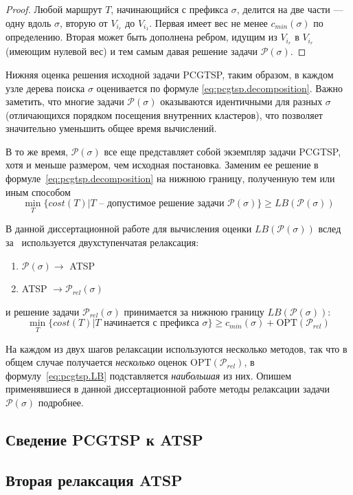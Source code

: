 \begin{proof}
  Любой маршрут $T$,
  начинающийся с префикса $\sigma$,
  делится на две части ---
  одну вдоль $\sigma$,
  вторую от $V_{i_r}$ до ${V_{i_1}}$.
  Первая имеет вес не менее $c_{min}(\sigma)$
  по определению.
  Вторая может быть дополнена ребром,
  идущим из $V_{i_r}$ в ${V_{i_r}}$
  (имеющим нулевой вес)
  и тем самым давая решение задачи
  $\mathcal P(\sigma)$.
\end{proof}

Нижняя оценка решения исходной задачи PCGTSP,
таким образом,
в каждом узле дерева поиска
$\sigma$
оценивается по формуле \eqref{eq:pcgtsp.decomposition}.
Важно заметить,
что многие задачи $\mathcal  P(\sigma)$
оказываются идентичными для разных $\sigma$
(отличающихся порядком посещения внутренних кластеров),
что позволяет значительно уменьшить общее время вычислений.

В то же время,
$\mathcal P(\sigma)$
все еще представляет собой экземпляр
задачи PCGTSP,
хотя и меньше размером,
чем исходная постановка.
Заменим ее решение в формуле~\eqref{eq:pcgtsp.decomposition}
на нижнюю границу,
полученную тем или иным способом
$$
\min_{T}\{cost(T)| T \text{ -- допустимое решение задачи } \mathcal P(\sigma)\}
\geqslant LB(\mathcal P(\sigma))
$$

В данной диссертационной работе для вычисления оценки
$LB(\mathcal P(\sigma))$
вслед за~\cite{SALMAN2020163}
используется двухступенчатая релаксация:
\begin{enumerate}
  \item $\mathcal P(\sigma) \to$ ATSP
  \item ATSP $\to \mathcal P_{rel}(\sigma)$
\end{enumerate}
и решение задачи $\mathcal P_{rel}(\sigma)$
принимается за нижнюю границу
$LB(\mathcal P(\sigma))$:
\begin{equation}
  \label{eq:pcgtsp.LB}
  \min_T \{cost(T)| T \text{ начинается с префикса } \sigma\}
  \geqslant
  c_{min}(\sigma) + \mathrm{OPT}(\mathcal P_{rel})
\end{equation}

На каждом из двух шагов релаксации используются
несколько методов,
так что в общем случае получается \textit{несколько}
оценок
$\mathrm{OPT}(\mathcal P_{rel})$,
в формулу~\eqref{eq:pcgtsp.LB}
подставляется \textit{наибольшая} из них.
Опишем применявшиеся в данной диссертационной работе
методы релаксации задачи
$\mathcal P(\sigma)$
подробнее.

\subsection*{Сведение PCGTSP к ATSP}



\subsection*{Вторая релаксация ATSP }
